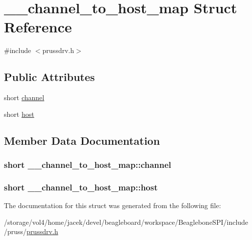 \hypertarget{struct____channel__to__host__map}{\section{\-\_\-\-\_\-channel\-\_\-to\-\_\-host\-\_\-map Struct Reference}
\label{struct____channel__to__host__map}
}


{\ttfamily \#include $<$prussdrv.\-h$>$}

\subsection*{Public Attributes}
\begin{DoxyCompactItemize}
\item 
short \hyperlink{struct____channel__to__host__map_aba81cea787f132fd67e37d429e869c9f}{channel}
\item 
short \hyperlink{struct____channel__to__host__map_a6e47ff59629590078c2c6c6ae715bbcf}{host}
\end{DoxyCompactItemize}


\subsection{Member Data Documentation}
\hypertarget{struct____channel__to__host__map_aba81cea787f132fd67e37d429e869c9f}{
\subsubsection[{channel}]{\setlength{\rightskip}{0pt plus 5cm}short \-\_\-\-\_\-channel\-\_\-to\-\_\-host\-\_\-map\-::channel}}\label{struct____channel__to__host__map_aba81cea787f132fd67e37d429e869c9f}
\hypertarget{struct____channel__to__host__map_a6e47ff59629590078c2c6c6ae715bbcf}{
\subsubsection[{host}]{\setlength{\rightskip}{0pt plus 5cm}short \-\_\-\-\_\-channel\-\_\-to\-\_\-host\-\_\-map\-::host}}\label{struct____channel__to__host__map_a6e47ff59629590078c2c6c6ae715bbcf}


The documentation for this struct was generated from the following file\-:\begin{DoxyCompactItemize}
\item 
/storage/vol4/home/jacek/devel/beagleboard/workspace/\-Beaglebone\-S\-P\-I/include/pruss/\hyperlink{prussdrv_8h}{prussdrv.\-h}\end{DoxyCompactItemize}
